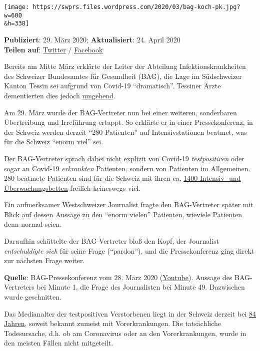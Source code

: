 \texttt{[image: https://swprs.files.wordpress.com/2020/03/bag-koch-pk.jpg?w=600\\\&h=338]}

\textbf{Publiziert}: 29. März 2020; \textbf{Aktualisiert}: 24. April
2020\\
\textbf{Teilen auf}:
\href{https://twitter.com/intent/tweet?url=https://swprs.org/das-bag-im-corona-fieber/}{Twitter}
/
\href{https://www.facebook.com/share.php?u=https://swprs.org/das-bag-im-corona-fieber/}{Facebook}

Bereits am Mitte März erklärte der Leiter der Abteilung
Infektionskrankheiten des Schweizer Bundesamtes für Gesundheit (BAG),
die Lage im Südschweizer Kanton Tessin sei aufgrund von Covid-19
``dramatisch''. Tessiner Ärzte dementierten dies jedoch
\href{https://www.blick.ch/news/schweiz/tessin/tessiner-spitaldirektor-widerspricht-dem-bundesamt-fuer-gesundheit-wir-haben-genuegend-intensivbetten-id15808076.html}{umgehend}.

Am 29. März wurde der BAG-Vertreter nun bei einer weiteren, sonderbaren
Übertreibung und Irreführung ertappt. So erklärte er in einer
Pressekonferenz, in der Schweiz werden derzeit ``280 Patienten'' auf
Intensivstationen beatmet, was für die Schweiz ``enorm viel'' sei.

Der BAG-Vertreter sprach dabei nicht explizit von Covid-19
\emph{testpositiven} oder sogar an Covid-19 \emph{erkrankten} Patienten,
sondern von Patienten im Allgemeinen. 280 beatmete Patienten sind für
die Schweiz mit ihren ca.
\href{https://www.vbs.admin.ch/de/home.detail.news.html/vbs-internet/wissenswertes/2020/200313.html}{1400
Intensiv- und Überwachungsbetten} freilich keineswegs viel.

Ein aufmerksamer Westschweizer Journalist fragte den BAG-Vertreter
später mit Blick auf dessen Aussage zu den ``enorm vielen'' Patienten,
wieviele Patienten denn normal seien.

Daraufhin schüttelte der BAG-Vertreter bloß den Kopf, der Journalist
\emph{entschuldigte sich} für seine Frage (``pardon''), und die
Pressekonferenz ging direkt zur nächsten Frage weiter.

\textbf{Quelle}: BAG-Pressekonferenz vom 28. März 2020
(\href{https://www.youtube.com/watch?v=3xc62D4GttI}{Youtube}). Aussage
des BAG-Vertreters bei Minute 1, die Frage des Journalisten bei Minute
49. Dazwischen wurde geschnitten.

Das Medianalter der testpositiven Verstorbenen liegt in der Schweiz
derzeit bei
\href{https://www.luzernerzeitung.ch/schweiz/corona-virus-das-sind-die-aktuellsten-entwicklungen-ld.1205558}{84
Jahren}, soweit bekannt zumeist mit Vorerkrankungen. Die tatsächliche
Todesursache, d.h. ob am Coronavirus oder an den Vorerkrankungen, wurde
in den meisten Fällen nicht mitgeteilt.

